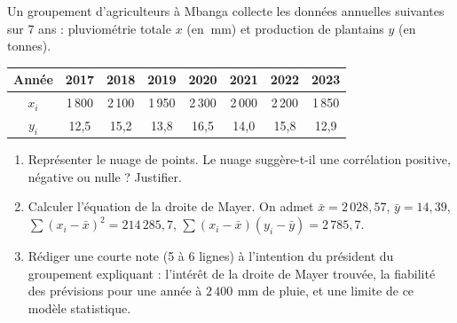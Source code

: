\documentclass[11pt]{article}
\begin{document}
\begin{exercice}
Un groupement d'agriculteurs à Mbanga collecte les données annuelles suivantes sur 7 ans : pluviométrie totale $x$ (en $\SI{}{\milli\meter}$) et production de plantains $y$ (en tonnes).
\begin{center}
\begin{tabular}{|c|c|c|c|c|c|c|c|}
\hline
Année & 2017 & 2018 & 2019 & 2020 & 2021 & 2022 & 2023 \\ \hline
$x_i$ & 1\,800 & 2\,100 & 1\,950 & 2\,300 & 2\,000 & 2\,200 & 1\,850 \\ \hline
$y_i$ & 12,5 & 15,2 & 13,8 & 16,5 & 14,0 & 15,8 & 12,9 \\ \hline
\end{tabular}
\end{center}
\begin{enumerate}
    \item Représenter le nuage de points. Le nuage suggère-t-il une corrélation positive, négative ou nulle ? Justifier.
    \item Calculer l'équation de la droite de Mayer. On admet $\bar{x} = 2\,028,57$, $\bar{y} = 14,39$, $\sum (x_i-\bar{x})^2 = 214\,285,7$, $\sum (x_i-\bar{x})(y_i-\bar{y}) = 2\,785,7$.
    \item Rédiger une courte note (5 à 6 lignes) à l'intention du président du groupement expliquant : l'intérêt de la droite de Mayer trouvée, la fiabilité des prévisions pour une année à $2\,400\,\SI{}{\milli\meter}$ de pluie, et une limite de ce modèle statistique.
\end{enumerate}
\end{exercice}
\end{document}
